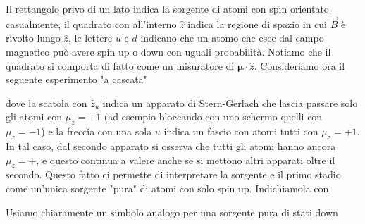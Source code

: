 \documentclass[a4paper, 11pt]{article}
\begin{document}
	\noindent Il rettangolo privo di un lato indica la sorgente di atomi con spin orientato casualmente, il quadrato con all'interno $\hat{z}$ indica la regione di spazio in cui $\vec{B}$ è rivolto lungo $\hat{z}$, le lettere $u$ e $d$ indicano che un atomo che esce dal campo magnetico può avere spin up o down con uguali probabilità. Notiamo che il quadrato si comporta di fatto come un misuratore di $\bm\mu\cdot\hat{z}$. Consideriamo ora il seguente esperimento "a cascata"
	\begin{figure}[h!]
		\centering
	\end{figure}

	\noindent dove la scatola con $\hat{z}_u$ indica un apparato di Stern-Gerlach che lascia passare solo gli atomi con $\mu_z=+1$ (ad esempio bloccando con uno schermo quelli con $\mu_z=-1$) e la freccia con una sola $u$ indica un fascio con atomi tutti con $\mu_z=+1$. In tal caso, dal secondo apparato si osserva che tutti gli atomi hanno ancora $\mu_z=+$, e questo continua a valere anche se si mettono altri apparati oltre il secondo. Questo fatto ci permette di interpretare la sorgente e il primo stadio come un'unica sorgente "pura" di atomi con solo spin up. Indichiamola con
	\begin{figure}[h!]
		\centering
	\end{figure}

	\noindent Usiamo chiaramente un simbolo analogo per una sorgente pura di stati down
		\begin{figure}[h!]
		\centering
	\end{figure}
\end{document}
